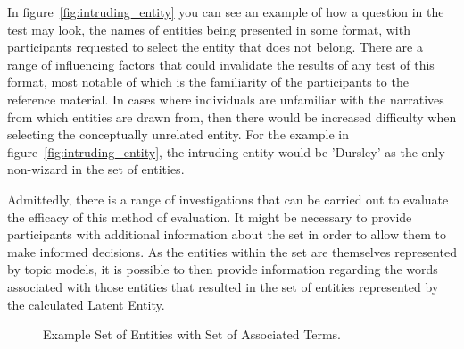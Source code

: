 \documentclass[10pt]{report}
\begin{document}
In figure~\ref{fig:intruding_entity} you can see an example of how a question in the test may look, the names of entities being presented in some format, with participants requested to select the entity that does not belong. There are a range of influencing factors that could invalidate the results of any test of this format, most notable of which is the familiarity of the participants to the reference material. In cases where individuals are unfamiliar with the narratives from which entities are drawn from, then there would be increased difficulty when selecting the conceptually unrelated entity. For the example in figure~\ref{fig:intruding_entity}, the intruding entity would be 'Dursley' as the only non-wizard in the set of entities.

Admittedly, there is a range of investigations that can be carried out to evaluate the efficacy of this method of evaluation. It might be necessary to provide participants with additional information about the set in order to allow them to make informed decisions. As the entities within the set are themselves represented by topic models, it is possible to then provide information regarding the words associated with those entities that resulted in the set of entities represented by the calculated Latent Entity.

\begin{figure}
  \centering
  \caption{Example Set of Entities with Set of Associated Terms.\label{fig:intruding_entitiy_terms}}
\end{figure}
\end{document}
